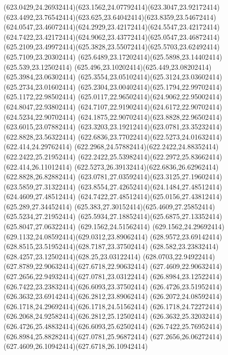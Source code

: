 {{	\curveto(623.0429,24.26932414)(623.1562,24.07792414)(623.3047,23.92172414)
	\curveto(623.4492,23.76542414)(623.625,23.64042414)(623.8359,23.54672414)
	\curveto(624.0547,23.46072414)(624.2929,23.42172414)(624.5547,23.42172414)
	\curveto(624.7422,23.42172414)(624.9062,23.43772414)(625.0547,23.46872414)
	\curveto(625.2109,23.49972414)(625.3828,23.55072414)(625.5703,23.62492414)
	\lineto(625.7109,23.20302414)
	\curveto(625.6489,23.17202414)(625.5898,23.14402414)(625.539,23.12502414)
	\curveto(625.496,23.10202414)(625.449,23.08202414)(625.3984,23.06302414)
	\curveto(625.3554,23.05102414)(625.3124,23.03602414)(625.2734,23.01602414)
	\curveto(625.2304,23.00402414)(625.1794,22.99702414)(625.1172,22.98502414)
	\curveto(625.0117,22.96502414)(624.9062,22.95002414)(624.8047,22.93802414)
	\curveto(624.7107,22.91902414)(624.6172,22.90702414)(624.5234,22.90702414)
	\curveto(624.1875,22.90702414)(623.8828,22.96502414)(623.6015,23.07882414)
	\curveto(623.3203,23.19212414)(623.0781,23.35232414)(622.8828,23.56322414)
	\curveto(622.6836,23.77022414)(622.5273,24.01632414)(622.414,24.29762414)
	\curveto(622.2968,24.57882414)(622.2422,24.88352414)(622.2422,25.21952414)
	\curveto(622.2422,25.53982414)(622.2972,25.83662414)(622.414,26.11012414)
	\curveto(622.5273,26.39132414)(622.6836,26.62962414)(622.8828,26.82882414)
	\curveto(623.0781,27.03592414)(623.3125,27.19602414)(623.5859,27.31322414)
	\curveto(623.8554,27.42652414)(624.1484,27.48512414)(624.4609,27.48512414)
	\curveto(624.7422,27.48512414)(625.0156,27.43812414)(625.289,27.34452414)
	\curveto(625.383,27.30152414)(625.4609,27.25852414)(625.5234,27.21952414)
	\curveto(625.5934,27.18852414)(625.6875,27.13352414)(625.8047,27.06322414)
	\closepath
	\moveto(629.1562,24.51562414)
	\curveto(629.1562,24.29692414)(629.1132,24.08592414)(629.0312,23.89062414)
	\curveto(628.9572,23.69142414)(628.8515,23.51952414)(628.7187,23.37502414)
	\curveto(628.582,23.23832414)(628.4257,23.12502414)(628.25,23.03122414)
	\curveto(628.0703,22.94922414)(627.8789,22.90632414)(627.6718,22.90632414)
	\curveto(627.4609,22.90632414)(627.2656,22.94932414)(627.0781,23.03122414)
	\curveto(626.8984,23.12522414)(626.7422,23.23832414)(626.6093,23.37502414)
	\curveto(626.4726,23.51952414)(626.3632,23.69142414)(626.2812,23.89062414)
	\curveto(626.2072,24.08592414)(626.1718,24.29692414)(626.1718,24.51562414)
	\curveto(626.1718,24.72272414)(626.2068,24.92582414)(626.2812,25.12502414)
	\curveto(626.3632,25.32032414)(626.4726,25.48832414)(626.6093,25.62502414)
	\curveto(626.7422,25.76952414)(626.8984,25.88282414)(627.0781,25.96872414)
	\curveto(627.2656,26.06272414)(627.4609,26.10942414)(627.6718,26.10942414)
}}
